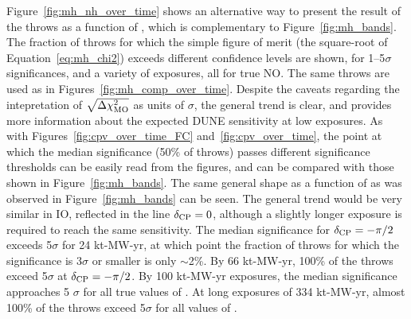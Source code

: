 Figure~\ref{fig:mh_nh_over_time} shows an alternative way to present the result of the throws as a function of \deltacp, which is complementary to Figure~\ref{fig:mh_bands}. The fraction of throws for which the simple figure of merit (the square-root of Equation~\ref{eq:mh_chi2}) exceeds different confidence levels are shown, for 1--5$\sigma$ significances, and a variety of exposures, all for true NO. The same throws are used as in Figures~\ref{fig:mh_comp_over_time}. Despite the caveats regarding the intepretation of $\sqrt{\Delta\chi^{2}_{\mathrm{MO}}}$ as units of $\sigma$, the general trend is clear, and provides more information about the expected DUNE sensitivity at low exposures. As with Figures~\ref{fig:cpv_over_time_FC} and~\ref{fig:cpv_over_time}, the point at which the median significance (50\% of throws) passes different significance thresholds can be easily read from the figures, and can be compared with those shown in Figure~\ref{fig:mh_bands}. The same general shape as a function of \deltacp as was observed in Figure~\ref{fig:mh_bands} can be seen. The general trend would be very similar in IO, reflected in the line $\delta_{\rm CP} = 0$, although a slightly longer exposure is required to reach the same sensitivity. The median significance for $\delta_{\rm CP} = -\pi/2$ exceeds 5$\sigma$ for 24 kt-MW-yr, at which point the fraction of throws for which the significance is 3$\sigma$ or smaller is only $\sim$2\%. By 66 kt-MW-yr, 100\% of the throws exceed 5$\sigma$ at $\delta_{\rm CP} = -\pi/2$. By 100 kt-MW-yr exposures, the median significance approaches 5 $\sigma$ for all true values of \deltacp. At long exposures of 334 kt-MW-yr, almost 100\% of the throws exceed 5$\sigma$ for all values of \deltacp.
